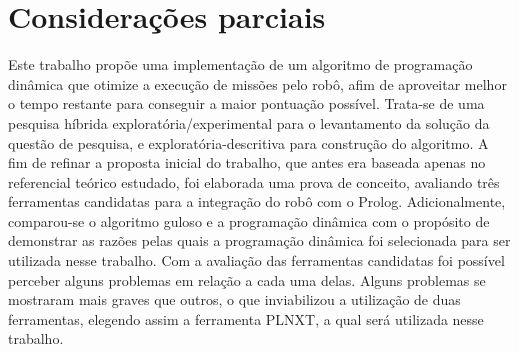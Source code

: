 \section{Considerações parciais}
Este trabalho propõe uma implementação de um algoritmo de programação dinâmica que otimize a execução de missões pelo robô, afim de aproveitar melhor o tempo restante para conseguir a maior pontuação possível. Trata-se de uma pesquisa híbrida exploratória/experimental para o levantamento da solução da questão de pesquisa, e exploratória-descritiva para construção do algoritmo. 
A fim de refinar a proposta inicial do trabalho, que antes era baseada apenas no referencial teórico estudado, foi elaborada uma prova de conceito, avaliando três ferramentas candidatas para a integração do robô com o Prolog. Adicionalmente, comparou-se  o algoritmo guloso e a programação dinâmica com o propósito de demonstrar as razões pelas quais a programação dinâmica foi selecionada para ser utilizada nesse trabalho.
Com a avaliação das ferramentas candidatas foi possível perceber alguns problemas em relação a cada uma delas. Alguns problemas se mostraram mais graves que outros, o que inviabilizou a utilização de duas ferramentas, elegendo assim a ferramenta PLNXT, a qual será utilizada nesse trabalho.